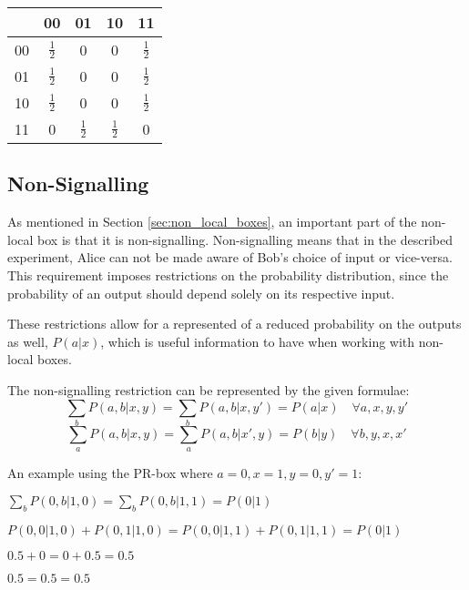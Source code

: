 \documentclass[report.tex]{subfiles}
\begin{document}
\begin{center}
\begin{tabular}{l | c c c c}
  & 00 & 01 & 10 & 11 \\
  \hline
  00 & \(\frac{1}{2}\) & 0 & 0 & \(\frac{1}{2}\) \\
  01 & \(\frac{1}{2}\) & 0 & 0 & \(\frac{1}{2}\) \\
  10 & \(\frac{1}{2}\) & 0 & 0 & \(\frac{1}{2}\) \\
  11 & 0 & \(\frac{1}{2}\) & \(\frac{1}{2}\) & 0 \\
\end{tabular}
\end{center}

\subsection{Non-Signalling} %
\label{sub:non_signalling}
As mentioned in Section \ref{sec:non_local_boxes}, an important part of the
non-local box is that it is non-signalling. Non-signalling means that in the
described experiment, Alice can not be made aware of Bob's choice of input or
vice-versa. This requirement imposes restrictions on the probability
distribution, since the probability of an output should depend solely on its
respective input. 

These restrictions allow for a represented of a reduced probability on the
outputs as well, \(P(a | x)\), which is useful information to have when
working with non-local boxes.

The non-signalling restriction can be represented by the given formulae:
\[\sum_{b} P(a, b | x, y) = \sum_{b} P(a, b | x, y') = P(a | x) 
\quad \forall a, x, y, y'\]
\[\sum_{a} P(a, b | x, y) = \sum_{a} P(a, b | x', y) = P(b | y) 
\quad \forall b, y, x, x'\]

An example using the PR-box where \(a = 0, x = 1, y = 0, y' = 1\):

\(\sum_{b} P(0, b | 1, 0) = \sum_{b} P(0, b | 1, 1) = P(0 | 1)\)

\(P(0, 0 | 1, 0) + P(0, 1 | 1, 0) = P(0, 0 | 1, 1) + P(0, 1 | 1, 1) = P(0 | 1)\)

\(0.5 + 0 = 0 + 0.5 = 0.5\)

\(0.5 = 0.5 = 0.5\)



\end{document}
